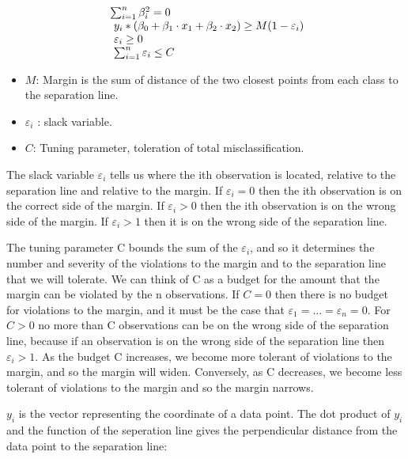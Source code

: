 \documentclass[10pt,letterpaper]{article}
\providecommand{\tightlist}{%
  \setlength{\itemsep}{0pt}\setlength{\parskip}{0pt}}
\begin{document}
\begin{equation}
  \left.
  \begin{array}{l@{\,}l}
     \sum_{i=1}^n \beta_i^2 = 0 \\
     \ y_i * ( \beta_0 + \beta_1 \cdot x_1 + \beta_2 \cdot x_2 ) \geq M(1-\varepsilon_i) \\
     \ \varepsilon_i \geq 0 \\
     \ \sum_{i=1}^n \varepsilon_i \leq C \\
  \end{array}
  \right.
\end{equation}

\begin{itemize}
\tightlist
\item
  \(M\): Margin is the sum of distance of the two closest points from
  each class to the separation line.
\item
  \(\varepsilon_i\) : slack variable.
\item
  \(C\): Tuning parameter, toleration of total misclassification.
\end{itemize}

The slack variable \(\varepsilon_i\) tells us where the ith observation
is located, relative to the separation line and relative to the margin.
If \(\varepsilon_i = 0\) then the ith observation is on the correct side
of the margin. If \(\varepsilon_i > 0\) then the ith observation is on
the wrong side of the margin. If \(\varepsilon_i > 1\) then it is on the
wrong side of the separation line.

The tuning parameter C bounds the sum of the \(\varepsilon_i\), and so
it determines the number and severity of the violations to the margin
and to the separation line that we will tolerate. We can think of C as a
budget for the amount that the margin can be violated by the n
observations. If \(C = 0\) then there is no budget for violations to the
margin, and it must be the case that
\(\varepsilon_1 = . . . = \varepsilon_n = 0\). For \(C > 0\) no more
than C observations can be on the wrong side of the separation line,
because if an observation is on the wrong side of the separation line
then \(\varepsilon_i > 1\). As the budget C increases, we become more
tolerant of violations to the margin, and so the margin will widen.
Conversely, as C decreases, we become less tolerant of violations to the
margin and so the margin narrows.

\(y_i\) is the vector representing the coordinate of a data point. The
dot product of \(y_i\) and the function of the seperation line gives the
perpendicular distance from the data point to the separation line:
\end{document}
